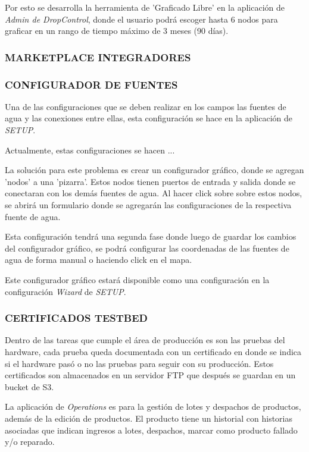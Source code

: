 Por esto se desarrolla la herramienta de 'Graficado Libre' en la aplicación de \textit{Admin de DropControl}, 
donde el usuario podrá escoger hasta 6 nodos para graficar en un rango de tiempo máximo de 3 meses (90 días).

\subsubsection{MARKETPLACE INTEGRADORES}



\subsubsection{CONFIGURADOR DE FUENTES}

Una de las configuraciones que se deben realizar en los campos las fuentes de agua y las conexiones entre ellas, esta configuración se hace en la aplicación de \textit{SETUP}.

Actualmente, estas configuraciones se hacen ...

La solución para este problema es crear un configurador gráfico, donde se agregan 'nodos' a una 'pizarra'. Estos nodos tienen puertos de entrada y salida donde se conectaran con los demás fuentes de agua. Al hacer click sobre sobre estos nodos, se abrirá un formulario donde se agregarán las configuraciones de la respectiva fuente de agua.

Esta configuración tendrá una segunda fase donde luego de guardar los cambios del configurador gráfico, se podrá configurar las coordenadas de las fuentes de agua de forma manual o haciendo click en el mapa.

Este configurador gráfico estará disponible como una configuración en la configuración \textit{Wizard} de \textit{SETUP}.

\subsubsection{CERTIFICADOS TESTBED}

Dentro de las tareas que cumple el área de producción es son las pruebas del hardware, cada prueba queda documentada con
un certificado en donde se indica si el hardware pasó o no las pruebas para seguir con su producción. Estos certificados son
almacenados en un servidor FTP que después se guardan en un bucket de S3.

La aplicación de \textit{Operations} es para la gestión de lotes y despachos de productos, además de la edición de productos. 
El producto tiene un historial con historias asociadas que indican ingresos a lotes, despachos, marcar como producto fallado y/o reparado.

